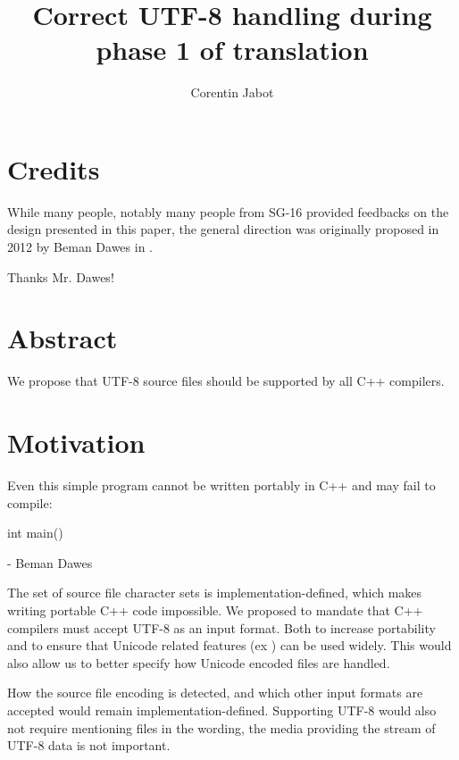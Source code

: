 \documentclass{wg21}
\title{Correct UTF-8 handling during phase 1 of translation}
\author{Corentin Jabot}{corentin.jabot@gmail.com}
\begin{document}
\maketitle


\section{Credits}

While many people, notably many people from SG-16 provided feedbacks on the design presented in this paper,
the general direction was originally proposed in 2012 by Beman Dawes in .

Thanks Mr. Dawes!

\section{Abstract}

We propose that UTF-8 source files should be supported by all C++ compilers.

\section{Motivation}

\begin{quoteblock}
    Even this simple program cannot be written portably in C++ and may fail to compile:
\begin{codeblock}
    int main() {}
\end{codeblock}
 - Beman Dawes
\end{quoteblock}

The set of source file character sets is implementation-defined, which makes writing portable C++ code impossible.
We proposed to mandate that C++ compilers must accept UTF-8 as an input format. Both to increase portability and
to ensure that Unicode related features (ex ) can be used widely.
This would also allow us to better specify how Unicode encoded files are handled.

How the source file encoding is detected, and which other input formats are accepted would remain implementation-defined.
Supporting UTF-8 would also not require mentioning files in the wording, the media providing the stream of UTF-8 data is not important.
\end{document}
